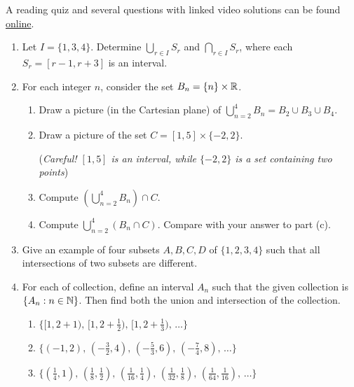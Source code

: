 \begin{exercises}{}{}
	A reading quiz and several questions with linked video solutions can be found \href{http://www.math.uci.edu/~ndonalds/math13/selftest/6-3-indexed.html}{online}.

	\begin{enumerate}
	  \item Let $I=\{1,3,4\}$. Determine $\bigcup_{r\in I}S_r$ and $\bigcap_{r\in I}S_r$, where each $S_r=[r-1,r+3]$ is an interval.
	  
	  
	  \item For each integer $n$, consider the set $B_n=\{n\}\times\mathbb{R}$.
		\begin{enumerate}
			\item Draw a picture (in the Cartesian plane) of $\bigcup_{n=2}^4B_n=B_2\cup B_3\cup B_4$.
			\item Draw a picture of the set $C=[1,5]\times\{-2,2\}$.\par
			(\emph{Careful! $[1,5]$ is an interval, while $\{-2,2\}$ is a set containing two points})
			\item Compute $\left(\bigcup_{n=2}^4B_n\right)\cap C$.
			\item Compute $\bigcup_{n=2}^4\left(B_n\cap C\right)$. Compare with your answer to part (c).
		\end{enumerate}
	  
	  
	  \goodbreak
	
	
	  \item Give an example of four subsets $A,B,C,D$ of $\{1,2,3,4\}$ such that all intersections of two subsets are different.
	
	
	  \item For each of collection, define an interval $A_n$ such that the given collection is $\{A_n:n\in\mathbb{N}\}$. Then find both the union and intersection of the collection.
	   \begin{enumerate}
	     \item $\bigl\{[1,2+1),\,[1,2+\frac 12),\,[1,2+\frac 13),\,\ldots\bigr\}$
	     \item $\bigl\{(-1,2),\,(-\frac 32,4),\,(-\frac 53,6),\,(-\frac 74,8),\,\ldots\bigr\}$
	     \item $\bigl\{(\frac 14,1),\,(\frac 18,\frac 12),\,(\frac 1{16},\frac 14),\,(\frac 1{32},\frac 18), \,(\frac 1{64},\frac 1{16}),\,\ldots\bigr\}$
	   \end{enumerate}
	  
	  
	

\end{enumerate}
\end{exercises}
